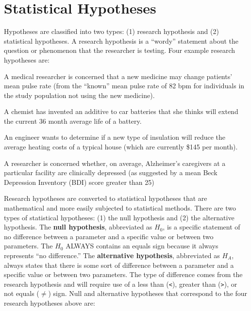 \documentclass[10pt,openany]{book}\usepackage[]{graphicx}\usepackage[]{color}
\begin{document}
\section{Statistical Hypotheses} \label{sec:Hypotheses}
Hypotheses are classified into two types: (1) research hypothesis and (2) statistical hypotheses. A research hypothesis is a ``wordy'' statement about the question or phenomenon that the researcher is testing. Four example research hypotheses are:

\vspace*{-8pt}
\begin{Enumerate}
  \item A medical researcher is concerned that a new medicine may change patients' mean pulse rate (from the ``known'' mean pulse rate of 82 bpm for individuals in the study population not using the new medicine).
   \item A chemist has invented an additive to car batteries that she thinks will extend the current 36 month average life of a battery.
  \item An engineer wants to determine if a new type of insulation will reduce the average heating costs of a typical house (which are currently \$145 per month).
  \item A researcher is concerned whether, on average, Alzheimer's caregivers at a particular facility are clinically depressed (as suggested by a mean Beck Depression Inventory (BDI) score greater than 25)
\end{Enumerate}
\vspace*{-8pt}

Research hypotheses are converted to statistical hypotheses that are mathematical and more easily subjected to statistical methods. There are two types of statistical hypotheses: (1) the null hypothesis and (2) the alternative hypothesis. The \textbf{null hypothesis}, abbreviated as $H_{0}$, is a specific statement of no difference between a parameter and a specific value or between two parameters. The $H_{0}$ ALWAYS contains an equals sign because it always represents ``no difference.''  The \textbf{alternative hypothesis}, abbreviated as $H_{A}$, always states that there is some sort of difference between a parameter and a specific value or between two parameters. The type of difference comes from the research hypothesis and will require use of a less than (\verb"<"), greater than (\verb">"), or not equals ($\neq$) sign. Null and alternative hypotheses that correspond to the four research hypotheses above are:
\end{document}
